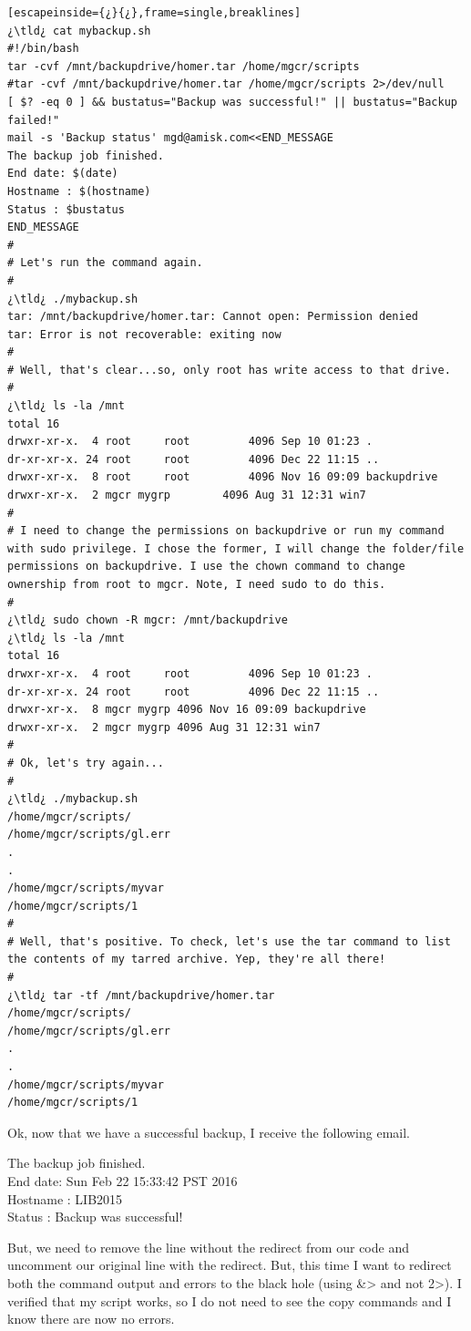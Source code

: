 \begin{lstlisting}[escapeinside={¿}{¿},frame=single,breaklines]
¿\tld¿ cat mybackup.sh
#!/bin/bash
tar -cvf /mnt/backupdrive/homer.tar /home/mgcr/scripts 
#tar -cvf /mnt/backupdrive/homer.tar /home/mgcr/scripts 2>/dev/null
[ $? -eq 0 ] && bustatus="Backup was successful!" || bustatus="Backup failed!"
mail -s 'Backup status' mgd@amisk.com<<END_MESSAGE
The backup job finished.
End date: $(date)
Hostname : $(hostname)
Status : $bustatus
END_MESSAGE
#
# Let's run the command again.
#
¿\tld¿ ./mybackup.sh
tar: /mnt/backupdrive/homer.tar: Cannot open: Permission denied
tar: Error is not recoverable: exiting now
#
# Well, that's clear...so, only root has write access to that drive.
#
¿\tld¿ ls -la /mnt
total 16
drwxr-xr-x.  4 root     root         4096 Sep 10 01:23 .
dr-xr-xr-x. 24 root     root         4096 Dec 22 11:15 ..
drwxr-xr-x.  8 root     root         4096 Nov 16 09:09 backupdrive
drwxr-xr-x.  2 mgcr mygrp		 4096 Aug 31 12:31 win7
#
# I need to change the permissions on backupdrive or run my command with sudo privilege. I chose the former, I will change the folder/file permissions on backupdrive. I use the chown command to change ownership from root to mgcr. Note, I need sudo to do this.
#
¿\tld¿ sudo chown -R mgcr: /mnt/backupdrive
¿\tld¿ ls -la /mnt
total 16
drwxr-xr-x.  4 root     root         4096 Sep 10 01:23 .
dr-xr-xr-x. 24 root     root         4096 Dec 22 11:15 ..
drwxr-xr-x.  8 mgcr mygrp 4096 Nov 16 09:09 backupdrive
drwxr-xr-x.  2 mgcr mygrp 4096 Aug 31 12:31 win7
#
# Ok, let's try again...
#
¿\tld¿ ./mybackup.sh
/home/mgcr/scripts/
/home/mgcr/scripts/gl.err
.
.
/home/mgcr/scripts/myvar
/home/mgcr/scripts/1
#
# Well, that's positive. To check, let's use the tar command to list the contents of my tarred archive. Yep, they're all there!
#
¿\tld¿ tar -tf /mnt/backupdrive/homer.tar
/home/mgcr/scripts/
/home/mgcr/scripts/gl.err
.
.
/home/mgcr/scripts/myvar
/home/mgcr/scripts/1
\end{lstlisting}

Ok, now that we have a successful backup, I receive the following email.

The backup job finished.\\
End date: Sun Feb 22 15:33:42 PST 2016\\
Hostname : LIB2015\\
Status : Backup was successful!

But, we need to remove the line without the redirect from our code and uncomment our original line with the redirect. But, this time I want to redirect both the command output and errors to the black hole (using \&> and not 2>). I verified that my script works, so I do not need to see the copy commands and I know there are now no errors.

